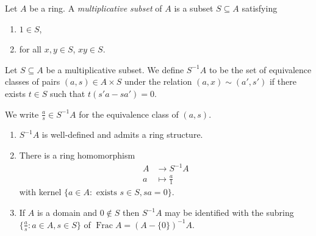 \documentclass[a4paper]{article}
\DeclareMathOperator{\Frac}{Frac}
\begin{document}
\begin{definition}
  Let \(A\) be a ring. A \emph{multiplicative subset} of \(A\) is a subset \(S \subseteq A\) satisfying
  \begin{enumerate}
  \item \(1 \in S\),
  \item for all \(x, y \in S\), \(xy \in S\).
  \end{enumerate}
\end{definition}

\begin{definition}
  Let \(S \subseteq A\) be a multiplicative subset. We define \(S^{-1} A\) to be the set of equivalence classes of pairs \((a, s) \in A \times S\) under the relation \((a, x) \sim (a', s')\) if there exists \(t \in S\) such that \(t(s'a - sa') = 0\).

  We write \(\frac{a}{s} \in S^{-1} A\) for the equivalence class of \((a, s)\).
\end{definition}

\begin{lemma}\leavevmode
  \begin{enumerate}
  \item \(S^{-1}A\) is well-defined and admits a ring structure.
  \item There is a ring homomorphism
    \begin{align*}
      A &\to S^{-1} A \\
      a &\mapsto \frac{a}{1}
    \end{align*}
    with kernel \(\{a \in A: \text{ exists } s \in S, sa = 0\}\).
  \item If \(A\) is a domain and \(0 \notin S\) then \(S^{-1}A\) may be identified with the subring \(\{\frac{a}{s}: a \in A, s \in S\}\) of \(\Frac A = (A - \{0\})^{-1} A\).
  \end{enumerate}
\end{lemma}
\end{document}
